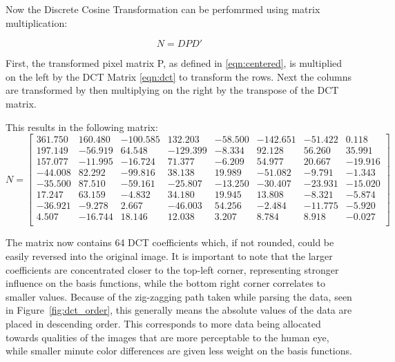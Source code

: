 \documentclass[11pt]{article}
\begin{document}
Now the Discrete Cosine Transformation can be perfomrmed using matrix multiplication:

\begin{equation}
  \label{eqn:transformation}
  N = DPD'
\end{equation}

First, the transformed pixel matrix P, as defined in \eqref{eqn:centered}, is multiplied on the left by the DCT Matrix \eqref{eqn:dct} to transform the rows.
Next the columns are transformed by then multiplying on the right by the transpose of the DCT matrix.

This results in the following matrix:
\begin{equation}
  \label{eqn:transformedMatrix}
  N = \begin{bmatrix}
    361.750 & 160.480 & -100.585 &  132.203 & -58.500 & -142.651 & -51.422 &   0.118 \\
    197.149 & -56.919 &   64.548 & -129.399 &  -8.334 &   92.128 &  56.260 &  35.991 \\
    157.077 & -11.995 &  -16.724 &   71.377 &  -6.209 &   54.977 &  20.667 & -19.916 \\
    -44.008 &  82.292 &  -99.816 &   38.138 &  19.989 &  -51.082 &  -9.791 &  -1.343 \\
    -35.500 &  87.510 &  -59.161 &  -25.807 & -13.250 &  -30.407 & -23.931 & -15.020 \\
     17.247 &  63.159 &   -4.832 &   34.180 &  19.945 &   13.808 &  -8.321 &  -5.874 \\
    -36.921 &  -9.278 &    2.667 &  -46.003 &  54.256 &   -2.484 & -11.775 &  -5.920 \\
      4.507 & -16.744 &   18.146 &   12.038 &   3.207 &    8.784 &   8.918 &  -0.027 \\
  \end{bmatrix}
\end{equation}

The matrix now contains 64 DCT coefficients which, if not rounded, could be easily reversed into the original image.
It is important to note that the larger coefficients are concentrated closer to the top-left corner, representing stronger influence on the basis functions, while the bottom right corner correlates to smaller values.
Because of the zig-zagging path taken while parsing the data, seen in Figure~\ref{fig:dct_order}, this generally means the absolute values of the data are placed in descending order.
This corresponds to more data being allocated towards qualities of the images that are more perceptable to the human eye, while smaller minute color differences are given less weight on the basis functions.
\end{document}
